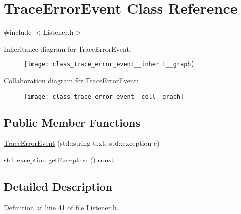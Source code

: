 \hypertarget{class_trace_error_event}{\section{Trace\-Error\-Event Class Reference}
\label{class_trace_error_event}
}


{\ttfamily \#include $<$Listener.\-h$>$}



Inheritance diagram for Trace\-Error\-Event\-:\nopagebreak
\begin{figure}[H]
\begin{center}
\leavevmode
\texttt{[image: class\_trace\_error\_event\_\_inherit\_\_graph]}
\end{center}
\end{figure}


Collaboration diagram for Trace\-Error\-Event\-:\nopagebreak
\begin{figure}[H]
\begin{center}
\leavevmode
\texttt{[image: class\_trace\_error\_event\_\_coll\_\_graph]}
\end{center}
\end{figure}
\subsection*{Public Member Functions}
\begin{DoxyCompactItemize}
\item 
\hyperlink{class_trace_error_event_a0dc19a8fa402afe8d99001f842cd62d2}{Trace\-Error\-Event} (std\-::string text, std\-::exception e)
\item 
std\-::exception \hyperlink{class_trace_error_event_a914c08001f46f73cf5c73f711bd14701}{get\-Exception} () const 
\end{DoxyCompactItemize}


\subsection{Detailed Description}


Definition at line 41 of file Listener.\-h.



